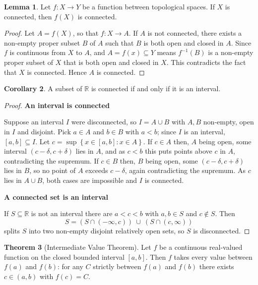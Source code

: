 \documentclass[11pt,a4paper]{article}
\theoremstyle{definition}
\newtheorem{thm}{Theorem}[subsection]
\newtheorem{coro}[thm]{Corollary}
\newtheorem{lem}[thm]{Lemma}
\newcommand{\subhead}[1]{%
  \par\medskip\noindent\textbf{#1}\par\nobreak\smallskip}
\begin{document}
\begin{lem}
Let $f:X\rightarrow Y$ be a function between topological spaces. If $X$ is connected, then $f(X)$ is connected.
\end{lem}

\begin{proof}
Let $A=f(X)$, so that $f:X\rightarrow A$. If $A$ is not connected, there exists a non-empty proper subset $B$ of $A$ such that $B$ is both open and closed in $A$. Since $f$ is continuous from $X$ to $A$, and $A=f(x)\subseteq Y$ means $f^{-1}(B)$ is a non-empty proper subset of $X$ that is both open and closed in $X$. This contradicts the fact that $X$ is connected. Hence $A$ is connected.
\end{proof}








\begin{coro}
A subset of $\mathbb{R}$ is connected if and only if it is an interval.
\end{coro}

\begin{proof}
\subhead{An interval is connected}
Suppose an interval $I$ were disconnected, so $I = A\cup B$ with $A,B$ non-empty,
open in $I$ and disjoint. Pick $a\in A$ and $b\in B$ with $a<b$; since $I$ is an
interval, $[a,b]\subseteq I$. Let $c = \sup\left\{x\in[a,b] : x\in A\right\}.$
If $c\in A$ then, $A$ being open, some interval $(c-\delta,c+\delta)$ lies in
$A$, and as $c<b$ this puts points above $c$ in $A$, contradicting the
supremum. If $c\in B$ then, $B$ being open, some $(c-\delta,c+\delta)$ lies in
$B$, so no point of $A$ exceeds $c-\delta$, again contradicting the supremum.
As $c$ lies in $A\cup B$, both cases are impossible and $I$ is connected.

\subhead{A connected set is an interval}
If $S\subseteq\mathbb{R}$ is not an interval there are $a<c<b$ with
$a,b\in S$ and $c\notin S$. Then
$$S = \left(S\cap(-\infty,c)\right)\ \cup\ \left(S\cap(c,\infty)\right)$$
splits $S$ into two non-empty disjoint relatively open sets, so $S$ is
disconnected.
\end{proof}





\begin{thm}[Intermediate Value Theorem]
Let $f$ be a continuous real-valued function on the closed bounded interval
$[a,b]$. Then $f$ takes every value between $f(a)$ and $f(b)$: for any $C$
strictly between $f(a)$ and $f(b)$ there exists $c\in(a,b)$ with $f(c)=C$.
\end{thm}
\end{document}
